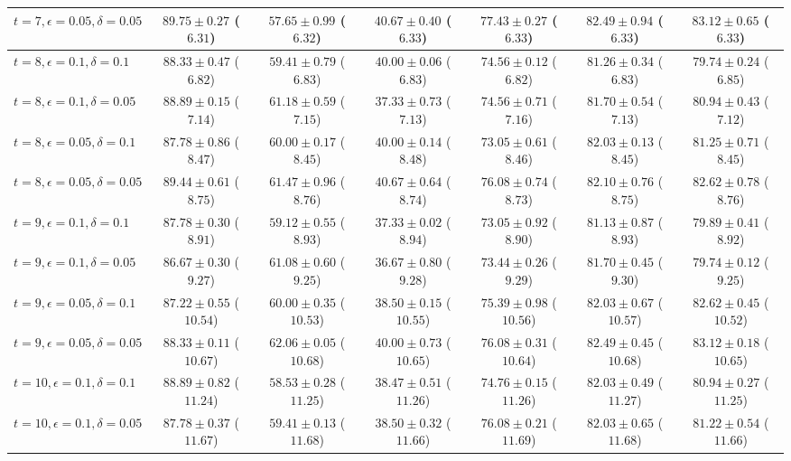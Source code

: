 \documentclass[journal]{IEEEtran}
\theoremstyle{definition}
\begin{document}
\begin{table*}[!t]
\begin{center}
{\begin{tabular}{|l|c|c|c|c|c|c|}
$t=7, \epsilon = 0.05, \delta = 0.05$ & $89.75 \pm 0.27$ ($6.31$) & $57.65 \pm 0.99$ ($6.32$) & $40.67 \pm 0.40$ ($6.33$) & $77.43 \pm 0.27$ ($6.33$) & $82.49 \pm 0.94$ ($6.33$) & $83.12 \pm 0.65$ ($6.33$) \\
\hline
$t=8, \epsilon = 0.1, \delta = 0.1$   & $88.33 \pm 0.47$ ($6.82$) & $59.41 \pm 0.79$ ($6.83$) & $40.00 \pm 0.06$ ($6.83$) & $74.56 \pm 0.12$ ($6.82$) & $81.26 \pm 0.34$ ($6.83$) & $79.74 \pm 0.24$ ($6.85$) \\
$t=8, \epsilon = 0.1, \delta = 0.05$  & $88.89 \pm 0.15$ ($7.14$) & $61.18 \pm 0.59$ ($7.15$) & $37.33 \pm 0.73$ ($7.13$) & $74.56 \pm 0.71$ ($7.16$) & $81.70 \pm 0.54$ ($7.13$) & $80.94 \pm 0.43$ ($7.12$) \\
$t=8, \epsilon = 0.05, \delta = 0.1$  & $87.78 \pm 0.86$ ($8.47$) & $60.00 \pm 0.17$ ($8.45$) & $40.00 \pm 0.14$ ($8.48$) & $73.05 \pm 0.61$ ($8.46$) & $82.03 \pm 0.13$ ($8.45$) & $81.25 \pm 0.71$ ($8.45$) \\
$t=8, \epsilon = 0.05, \delta = 0.05$ & $89.44 \pm 0.61$ ($8.75$) & $61.47 \pm 0.96$ ($8.76$) & $40.67 \pm 0.64$ ($8.74$) & $76.08 \pm 0.74$ ($8.73$) & $82.10 \pm 0.76$ ($8.75$) & $82.62 \pm 0.78$ ($8.76$) \\
\hline
$t=9, \epsilon = 0.1, \delta = 0.1$   & $87.78 \pm 0.30$ ($8.91$) & $59.12 \pm 0.55$ ($8.93$) & $37.33 \pm 0.02$ ($8.94$) & $73.05 \pm 0.92$ ($8.90$) & $81.13 \pm 0.87$ ($8.93$) & $79.89 \pm 0.41$ ($8.92$) \\
$t=9, \epsilon = 0.1, \delta = 0.05$  & $86.67 \pm 0.30$ ($9.27$) & $61.08 \pm 0.60$ ($9.25$) & $36.67 \pm 0.80$ ($9.28$) & $73.44 \pm 0.26$ ($9.29$) & $81.70 \pm 0.45$ ($9.30$) & $79.74 \pm 0.12$ ($9.25$) \\
$t=9, \epsilon = 0.05, \delta = 0.1$  & $87.22 \pm 0.55$ ($10.54$) & $60.00 \pm 0.35$ ($10.53$) & $38.50 \pm 0.15$ ($10.55$) & $75.39 \pm 0.98$ ($10.56$) & $82.03 \pm 0.67$ ($10.57$) & $82.62 \pm 0.45$ ($10.52$) \\
$t=9, \epsilon = 0.05, \delta = 0.05$ & $88.33 \pm 0.11$ ($10.67$) & $62.06 \pm 0.05$ ($10.68$) & $40.00 \pm 0.73$ ($10.65$) & $76.08 \pm 0.31$ ($10.64$) & $82.49 \pm 0.45$ ($10.68$) & $83.12 \pm 0.18$ ($10.65$) \\
\hline
$t=10, \epsilon = 0.1, \delta = 0.1$   & $88.89 \pm 0.82$ ($11.24$) & $58.53 \pm 0.28$ ($11.25$) & $38.47 \pm 0.51$ ($11.26$) & $74.76 \pm 0.15$ ($11.26$) & $82.03 \pm 0.49$ ($11.27$) & $80.94 \pm 0.27$ ($11.25$) \\
$t=10, \epsilon = 0.1, \delta = 0.05$  & $87.78 \pm 0.37$ ($11.67$) & $59.41 \pm 0.13$ ($11.68$) & $38.50 \pm 0.32$ ($11.66$) & $76.08 \pm 0.21$ ($11.69$) & $82.03 \pm 0.65$ ($11.68$) & $81.22 \pm 0.54$ ($11.66$) \\

\end{tabular}}
\end{center}
\end{table*}
\end{document}
